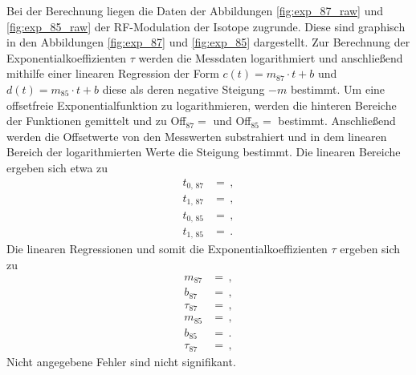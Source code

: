Bei der Berechnung liegen die Daten der Abbildungen \ref{fig:exp_87_raw} und \ref{fig:exp_85_raw} der RF-Modulation der Isotope zugrunde.
Diese sind graphisch in den Abbildungen \ref{fig:exp_87} und \ref{fig:exp_85} dargestellt.
Zur Berechnung der Exponentialkoeffizienten $\tau$ werden die Messdaten logarithmiert und anschließend mithilfe einer linearen Regression der Form $c(t)=m_\text{87} \cdot t + b$ und $d(t)=m_\text{85} \cdot t + b$ diese als deren negative Steigung $-m$ bestimmt.
Um eine offsetfreie Exponentialfunktion zu logarithmieren, werden die hinteren Bereiche der Funktionen gemittelt und zu Off$_\text{87} = $ und Off$_\text{85} = $ bestimmt.
Anschließend werden die Offsetwerte von den Messwerten substrahiert und in dem linearen Bereich der logarithmierten Werte die Steigung bestimmt.
Die linearen Bereiche ergeben sich etwa zu
\begin{align*}
    t_\text{0, 87} &=  \,,\\
    t_\text{1, 87} &=  \,,\\
    t_\text{0, 85} &=  \,,\\
    t_\text{1, 85} &=  \,.
\end{align*}
Die linearen Regressionen und somit die Exponentialkoeffizienten $\tau$ ergeben sich zu
\begin{align*}
    m_\text{87} &=  \,,\\
    b_\text{87} &=  \,,\\
    \tau_\text{87} &=  \,,\\
    m_\text{85} &=  \,,\\
    b_\text{85} &=  \,.\\
    \tau_\text{87} &=  \,,
\end{align*}
Nicht angegebene Fehler sind nicht signifikant.

